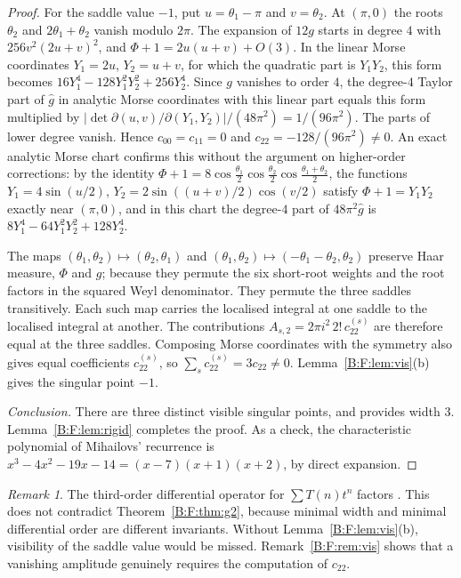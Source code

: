 \documentclass[11pt,a4paper]{article}
\theoremstyle{definition}
\theoremstyle{remark}
\newtheorem{remark}[theorem]{Remark}
\numberwithin{equation}{section}
\begin{document}
\begin{proof}
For the saddle value $-1$, put $u=\theta_1-\pi$ and $v=\theta_2$. At
$(\pi,0)$ the roots $\theta_2$ and $2\theta_1+\theta_2$ vanish modulo $2\pi$.
The expansion of $12g$ starts in degree $4$ with $256v^2(2u+v)^2$, and
$\Phi+1=2u(u+v)+O(3)$. In the linear Morse coordinates $Y_1=2u$, $Y_2=u+v$,
for which the quadratic part is $Y_1Y_2$, this form becomes
$16Y_1^4-128Y_1^2Y_2^2+256Y_2^4$. Since $g$ vanishes to order $4$, the
degree-$4$ Taylor part of $\widehat g$ in analytic Morse coordinates with
this linear part equals this form multiplied by
$|\det\partial(u,v)/\partial(Y_1,Y_2)|/(48\pi^2)=1/(96\pi^2)$. The parts of
lower degree vanish. Hence $c_{00}=c_{11}=0$ and
$c_{22}=-128/(96\pi^2)\ne0$. An exact analytic Morse chart confirms this without the
argument on higher-order corrections: by the identity
$\Phi+1=8\cos\frac{\theta_1}2\cos\frac{\theta_2}2\cos\frac{\theta_1+\theta_2}2$, the
functions $Y_1=4\sin(u/2)$, $Y_2=2\sin((u+v)/2)\cos(v/2)$ satisfy $\Phi+1=Y_1Y_2$ exactly
near $(\pi,0)$, and in this chart the degree-$4$ part of $48\pi^2\widehat g$ is
$8Y_1^4-64Y_1^2Y_2^2+128Y_2^4$.

The maps $(\theta_1,\theta_2)\mapsto(\theta_2,\theta_1)$ and
$(\theta_1,\theta_2)\mapsto(-\theta_1-\theta_2,\theta_2)$ preserve Haar
measure, $\Phi$ and $g$; because they permute the six short-root weights and the root factors in the squared Weyl denominator. They permute the three saddles transitively. Each such map carries the localised
integral at one saddle to the localised integral at another. The
contributions $A_{s,2}=2\pi i^2\,2!\,c^{(s)}_{22}$ are therefore equal at
the three saddles. Composing Morse coordinates with the symmetry also gives
equal coefficients $c^{(s)}_{22}$, so $\sum_sc^{(s)}_{22}=3c_{22}\ne0$.
Lemma~\ref{B:F:lem:vis}(b) gives the singular point $-1$.

\emph{Conclusion.} There are three distinct visible singular points, and
\cite[Theorem~1.3]{R059} provides width $3$. Lemma~\ref{B:F:lem:rigid}
completes the proof. As a check, the characteristic polynomial of Mihailovs'
recurrence is $x^3-4x^2-19x-14=(x-7)(x+1)(x+2)$, by direct expansion.
\end{proof}

\begin{remark}\label{B:F:rem:g2}
The third-order differential operator for $\sum T(n)t^n$ factors
\cite[\S3.4]{R059}. This does not contradict Theorem~\ref{B:F:thm:g2},
because minimal width and minimal differential order are different
invariants. Without Lemma~\ref{B:F:lem:vis}(b), visibility of the saddle value
would be missed. Remark~\ref{B:F:rem:vis} shows that a vanishing amplitude
genuinely requires the computation of $c_{22}$.
\end{remark}
\end{document}
